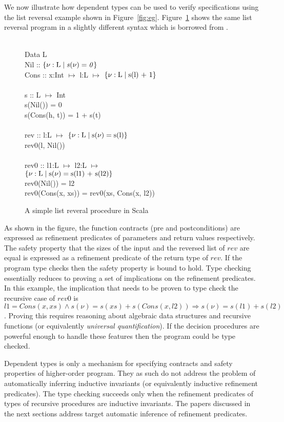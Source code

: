 We now illustrate how dependent types can be used to verify specifications using 
the list reversal example shown in Figure~\ref{fig:eg}.
Figure~\ref{fig:deptypes-eg} shows the same list reversal program 
in a slightly different syntax which is borrowed from \cite{rjhala:ESOP13}.
%
\begin{figure}
\begin{myprogram}
\\
\pnl Data L \\
\pnl \>   Nil :: $\mathit{\{ \nu:\text{L} \; | \; s(\nu) = 0\}}$  \\
\pnl \>   Cons :: x:Int $\mapsto$ l:L $\mapsto$ 
				$\mathit{\{ \nu:\text{L} \; | \; \text{s(l) + 1}\}}$ \\
\\
\pnl s :: L $\mapsto$ Int \\
\pnl \>    s(Nil()) = 0 \\
\pnl \>    s(Cons(h, t)) = 1 + s(t) \\
\\
\pnl rev :: l:L $\mapsto$ $\mathit{\{ \nu:\text{L} \; | \; \text{s}(\nu) = \text{s(l)}\}}$ \\
\pnl \> rev0(l, Nil())  \\
\\    
\pnl rev0 :: l1:L $\mapsto$ l2:L $\mapsto$  \\
\> \> \> \> \> $\mathit{\{ \nu:\text{L} \; | \; \text{s}(\nu) = \text{s(l1) + s(l2)}\}}$  \\
\pnl \> rev0(Nil()) = l2 \\
\pnl \> rev0(Cons(x, xs)) = rev0(xs, Cons(x, l2))
\end{myprogram}
\caption{A simple list reveral procedure in Scala} \label{fig:deptypes-eg}
\end{figure}
%
As shown in the figure, the function contracts (pre and postconditions) are expressed as refinement predicates of parameters and return values respectively. 
The safety property that the sizes of the input and the reversed list of $rev$ are equal is expressed as a refinement predicate of the return type of $rev$. If the 
program type checks then the safety property is bound to hold.
Type checking essentially reduces to proving a set of implications on the refinement predicates. In this example, the implication that needs to be proven to type check the recursive case of $rev0$ is $l1 = Cons(x,xs) \wedge s(\nu) = s(xs) + s(Cons(x,l2)) \Rightarrow s(\nu) = s(l1) + s(l2)$.
Proving this requires reasoning about algebraic data structures and recursive functions (or equivalently \emph{universal quantification}). If the decision
procedures are powerful enough to handle these features then the program could be type checked.

Dependent types is only a mechanism for specifying contracts and safety properties of higher-order program. They as such do not address the problem of automatically inferring inductive invariants (or equivalently inductive refinement predicates). The type checking succeeds only when the refinement predicates of types of recursive procedures are inductive invariants. The papers discussed in the next sections address target automatic inference of refinement predicates.